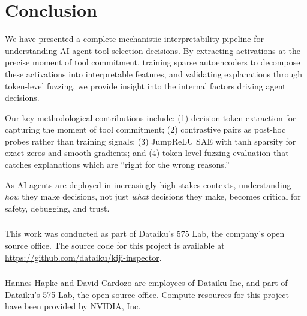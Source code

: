 \documentclass[runningheads]{llncs}
\begin{document}
\section{Conclusion}
\label{sec:conclusion}

We have presented a complete mechanistic interpretability pipeline for understanding AI agent tool-selection decisions. By extracting activations at the precise moment of tool commitment, training sparse autoencoders to decompose these activations into interpretable features, and validating explanations through token-level fuzzing, we provide insight into the internal factors driving agent decisions.

Our key methodological contributions include: (1) decision token extraction for capturing the moment of tool commitment; (2) contrastive pairs as post-hoc probes rather than training signals; (3) JumpReLU SAE with tanh sparsity for exact zeros and smooth gradients; and (4) token-level fuzzing evaluation that catches explanations which are ``right for the wrong reasons.''

As AI agents are deployed in increasingly high-stakes contexts, understanding \emph{how} they make decisions, not just \emph{what} decisions they make, becomes critical for safety, debugging, and trust.


\begin{credits}
\subsubsection{\ackname}
This work was conducted as part of Dataiku's 575 Lab, the company's open source office.
The source code for this project is available at \url{https://github.com/dataiku/kiji-inspector}.

\subsubsection{\discintname}
Hannes Hapke and David Cardozo are employees of Dataiku Inc, and part of Dataiku's 575 Lab, the open source office. Compute resources for this project have been provided by NVIDIA, Inc.
\end{credits}



\end{document}
